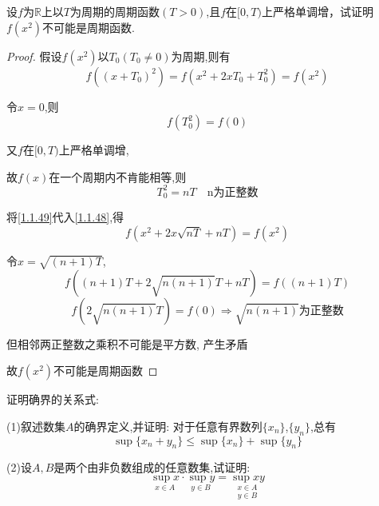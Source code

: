 \vspace{5pt}
\begin{exercise}
    设$f$为$\mathbb{R}$上以$T$为周期的周期函数$(T>0)$,且$f$在$[0,T)$上严格单调增，试证明$f(x^2)$不可能是周期函数. 
\end{exercise}

\begin{proof}

    假设$f(x^2)$以$T_0(T_0\ne 0)$为周期,则有
    \begin{equation}
        f((x+T_0)^2)=f(x^2+2xT_0+T_0^2)=f(x^2)  \label{1.1.48}
    \end{equation}

    令$x=0$,则
    \begin{equation*}
        f(T_0^2)=f(0)
    \end{equation*}

    又$f$在$[0,T)$上严格单调增,

    故$f(x)$在一个周期内不肯能相等,则
    \begin{equation}
        T_0^2=nT \quad \mbox{n为正整数} \label{1.1.49}
    \end{equation}

    将\cref{1.1.49}代入\cref{1.1.48},得
    \begin{equation*}
        f(x^2+2x\sqrt{nT}+nT)=f(x^2)
    \end{equation*}

    令$x=\sqrt{(n+1)T}$,
    \begin{equation*}
        f((n+1)T+2\sqrt{n(n+1)}T+nT)=f((n+1)T)
    \end{equation*}
    \begin{equation*}
        f(2\sqrt{n(n+1)}T)=f(0)\Longrightarrow \sqrt{n(n+1)}\mbox{为正整数}
    \end{equation*}

    但相邻两正整数之乘积不可能是平方数, 产生矛盾

    故$f(x^2)$不可能是周期函数
\end{proof}

\begin{exercise}
    证明确界的关系式:

    (1)叙述数集$A$的确界定义,并证明:
    对于任意有界数列$\{x_n\}$,$\{y_n\}$,总有
    \begin{equation}
        \sup\{x_n+y_n\}\le \sup\{x_n\}+\sup\{y_n\}
    \end{equation}

    (2)设$A,B$是两个由非负数组成的任意数集,试证明:
    \begin{equation}
        \underset{x\in A}{\sup x} \cdot \underset{y \in B}{\sup y} = \underset{y \in B}{\underset{x \in A}{\sup xy}}
    \end{equation}
\end{exercise}

